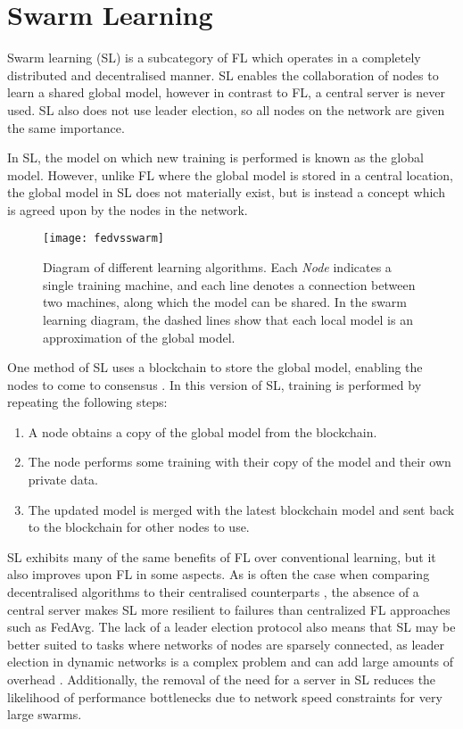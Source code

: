 \section{Swarm Learning}
Swarm learning (SL) is a subcategory of FL which operates in a completely distributed and decentralised manner. SL enables the collaboration of nodes to learn a shared global model, however in contrast to FL, a central server is never used. SL also does not use leader election, so all nodes on the network are given the same importance.

In SL, the model on which new training is performed is known as the global model. However, unlike FL where the global model is stored in a central location, the global model in SL does not materially exist, but is instead a concept which is agreed upon by the nodes in the network.

\begin{figure}[h]
	\texttt{[image: fedvsswarm]}
	\caption{Diagram of different learning algorithms. Each \emph{Node} indicates a single training machine, and each line denotes a connection between two machines, along which the model can be shared. In the swarm learning diagram, the dashed lines show that each local model is an approximation of the global model.} \label{fig_learning}
\end{figure}

One method of SL uses a blockchain to store the global model, enabling the nodes to come to consensus \cite{swarm_learning}. In this version of SL, training is performed by repeating the following steps:
\begin{enumerate}
	\item A node obtains a copy of the global model from the blockchain.
	\item The node performs some training with their copy of the model and their own private data.
	\item The updated model is merged with the latest blockchain model and sent back to the blockchain for other nodes to use.
\end{enumerate}

SL exhibits many of the same benefits of FL over conventional learning, but it also improves upon FL in some aspects. As is often the case when comparing decentralised algorithms to their centralised counterparts \cite{swarm_resil}, the absence of a central server makes SL more resilient to failures than centralized FL approaches such as FedAvg. The lack of a leader election protocol also means that SL may be better suited to tasks where networks of nodes are sparsely connected, as leader election in dynamic networks is a complex problem and can add large amounts of overhead \cite{leaderelection}. Additionally, the removal of the need for a server in SL reduces the likelihood of performance bottlenecks due to network speed constraints for very large swarms.

